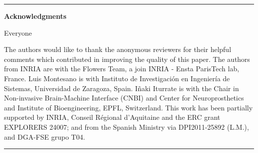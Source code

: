 
\begin{vcenterpage}
\noindent\rule[2pt]{\textwidth}{0.5pt}
\begin{center}
{\large\textbf{Acknowledgments\\}}
\end{center}

Everyone

The authors would like to thank the anonymous reviewers for their helpful comments which contributed in improving the quality of this paper. The authors from INRIA are with the Flowers Team, a join INRIA - Ensta ParisTech lab, France. Luis Montesano is with Instituto de Investigaci\'{o}n en Ingenier\'{i}a de Sistemas, Universidad de Zaragoza, Spain. I\~{n}aki Iturrate is with the Chair in Non-invasive Brain-Machine Interface (CNBI) and Center for Neuroprosthetics and Institute of Bioengineering, EPFL, Switzerland. This work has been partially supported by INRIA, Conseil R\'egional d'Aquitaine and the ERC grant EXPLORERS 24007; and from the Spanish Ministry via DPI2011-25892 (L.M.), and DGA-FSE grupo T04.

\noindent\rule[2pt]{\textwidth}{0.5pt}
\end{vcenterpage}